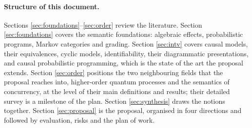 \paragraph{Structure of this document.}
Sections \ref{sec:foundations}--\ref{sec:order} review the literature. Section \ref{sec:foundations} covers the semantic foundations: algebraic effects, probabilistic programs, Markov categories and grading. Section \ref{sec:intv} covers causal models, their equivalences, cyclic models, identifiability, their diagrammatic presentations, and causal probabilistic programming, which is the state of the art the proposal extends. Section \ref{sec:order} positions the two neighbouring fields that the proposal reaches into, higher-order quantum processes and the semantics of concurrency, at the level of their main definitions and results; their detailed survey is a milestone of the plan. Section \ref{sec:synthesis} draws the notions together. Section \ref{sec:proposal} is the proposal, organised in four directions and followed by evaluation, risks and the plan of work.
